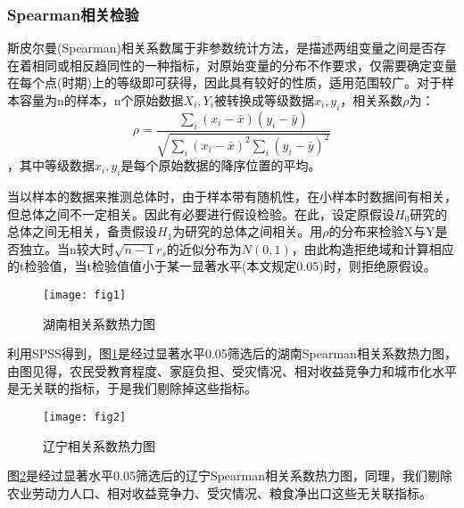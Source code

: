 \documentclass[withoutpreface,bwprint]{cumcmthesis} %
\begin{document}
\subsubsection{Spearman相关检验}
斯皮尔曼(Spearman)相关系数属于非参数统计方法，是描述两组变量之间是否存在着相同或相反趋同性的一种指标，对原始变量的分布不作要求，仅需要确定变量在每个点(时期)上的等级即可获得，因此具有较好的性质，适用范围较广。对于样本容量为n的样本，n个原始数据$ X_{i},Y_{i}$被转换成等级数据$ x_{i},y_{i}$，相关系数$\rho$为：
\begin{equation*}
\rho=\frac{\sum_{i}\left(x_{i}-\bar{x}\right)\left(y_{i}-\bar{y}\right)}{\sqrt{\sum_{i}\left(x_{i}-\bar{x}\right)^{2} \sum_{i}\left(y_{i}-\bar{y}\right)^{2}}}
\end{equation*}
，其中等级数据$x_{i},y_{i}$是每个原始数据的降序位置的平均。\par
当以样本的数据来推测总体时，由于样本带有随机性，在小样本时数据间有相关，但总体之间不一定相关。因此有必要进行假设检验。在此，设定原假设$H_0$研究的总体之间无相关，备责假设$H_1$为研究的总体之间相关。用$\rho$的分布来检验X与Y是否独立。当n较大时$\sqrt{n-1} r_{s}$的近似分布为$N(0,1)$，由此构造拒绝域和计算相应的t检验值，当t检验值值小于某一显著水平(本文规定0.05)时，则拒绝原假设。
\begin{figure}[!h]
    \centering
    \texttt{[image: fig1]}
    \caption{湖南相关系数热力图}
    \label{fig:sp1}
\end{figure}\par
利用SPSS得到，图\ref{fig:sp1}是经过显著水平0.05筛选后的湖南Spearman相关系数热力图，由图见得，农民受教育程度、家庭负担、受灾情况、相对收益竞争力和城市化水平是无关联的指标，于是我们剔除掉这些指标。\par
\begin{figure}[!h]
    \centering
    \texttt{[image: fig2]}
    \caption{辽宁相关系数热力图}
    \label{fig:sp2}
\end{figure}\par
图\ref{fig:sp2}是经过显著水平0.05筛选后的辽宁Spearman相关系数热力图，同理，我们剔除农业劳动力人口、相对收益竞争力、受灾情况、粮食净出口这些无关联指标。\par
\end{document}
